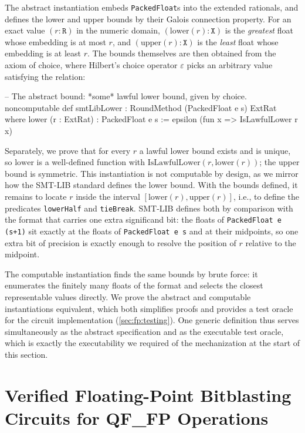 The abstract instantiation embeds \texttt{PackedFloat}s into the extended rationals,
and defines the lower and upper bounds by their Galois connection property.
For an exact value $(r : \texttt{R})$ in the numeric domain,
$(\mathrm{lower}(r) : \texttt{X})$ is the \emph{greatest} float whose embedding is at most $r$,
and $(\mathrm{upper}(r) : \texttt{X})$ is the \emph{least} float whose embedding is at least $r$.
The bounds themselves are then obtained from the axiom of choice,
where Hilbert's choice operator $\varepsilon$ picks an arbitrary value satisfying the
relation:
\begin{lean4}
-- The abstract bound: *some* lawful lower bound, given by choice.
noncomputable def smtLibLower : RoundMethod (PackedFloat e s) ExtRat where
  lower (r : ExtRat) : PackedFloat e s := epsilon (fun x => IsLawfulLower r x)
\end{lean4}
Separately, we prove that for every $r$ a lawful lower bound exists and is unique,
so $\mathrm{lower}$ is a well-defined function with $\mathrm{IsLawfulLower}(r, \mathrm{lower}(r))$;
the upper bound is symmetric.
This instantiation is not computable by design, as we mirror how the SMT-LIB standard defines the lower bound.
With the bounds defined, it remains to locate $r$ inside the interval $[\mathrm{lower}(r), \mathrm{upper}(r)]$,
i.e., to define the predicates \texttt{lowerHalf} and \texttt{tieBreak}.
SMT-LIB defines both by comparison with the format that carries one extra significand bit:
the floats of \texttt{PackedFloat e (s+1)} sit exactly at the floats of \texttt{PackedFloat e s} and at their midpoints,
so one extra bit of precision is exactly enough to resolve the position of $r$ relative to the midpoint.

The computable instantiation finds the same bounds by brute
force:
it enumerates the finitely many floats of the format and selects the closest representable values directly.
We prove the abstract and computable instantiations equivalent,
which both simplifies proofs and provides a test oracle for the circuit implementation (\cref{sec:fp:testing}).
One generic definition thus serves simultaneously as the abstract specification and as the executable test oracle,
which is exactly the executability we required of the mechanization at the start of this section.

\section{Verified Floating-Point Bitblasting Circuits for QF\_FP Operations}
\label{sec:fp:design}


